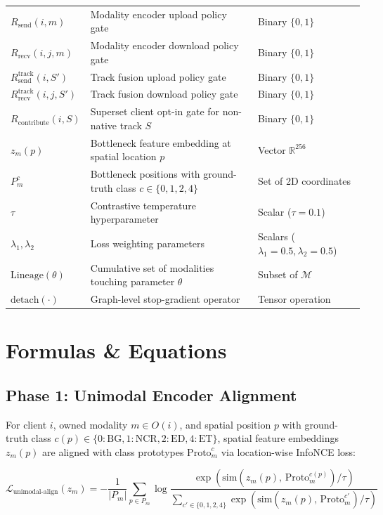 \documentclass[11pt,a4paper]{article}
\begin{document}
\begin{table}[h!]
\begin{tabular}{@{}llp{5.5cm}@{}}
$R_{\text{send}}(i,m)$ & Modality encoder upload policy gate & Binary $\{0,1\}$ \\
$R_{\text{recv}}(i,j,m)$ & Modality encoder download policy gate & Binary $\{0,1\}$ \\
$R_{\text{send}}^{\text{track}}(i,S')$ & Track fusion upload policy gate & Binary $\{0,1\}$ \\
$R_{\text{recv}}^{\text{track}}(i,j,S')$ & Track fusion download policy gate & Binary $\{0,1\}$ \\
$R_{\text{contribute}}(i,S)$ & Superset client opt-in gate for non-native track $S$ & Binary $\{0,1\}$ \\
$z_m(p)$ & Bottleneck feature embedding at spatial location $p$ & Vector $\mathbb{R}^{256}$ \\
$P_m^c$ & Bottleneck positions with ground-truth class $c \in \{0,1,2,4\}$ & Set of 2D coordinates \\
$\tau$ & Contrastive temperature hyperparameter & Scalar ($\tau = 0.1$) \\
$\lambda_1, \lambda_2$ & Loss weighting parameters & Scalars ($\lambda_1=0.5, \lambda_2=0.5$) \\
$\text{Lineage}(\theta)$ & Cumulative set of modalities touching parameter $\theta$ & Subset of $\mathcal{M}$ \\
$\text{detach}(\cdot)$ & Graph-level stop-gradient operator & Tensor operation \\ \bottomrule
\end{tabular}
\end{table}

\newpage

\section{Formulas \& Equations}

\subsection{Phase 1: Unimodal Encoder Alignment}

For client $i$, owned modality $m \in O(i)$, and spatial position $p$ with ground-truth class $c(p) \in \{0:\text{BG}, 1:\text{NCR}, 2:\text{ED}, 4:\text{ET}\}$, spatial feature embeddings $z_m(p)$ are aligned with class prototypes $\text{Proto}_m^c$ via location-wise InfoNCE loss:

\begin{equation}
\mathcal{L}_{\text{unimodal-align}}(z_m) = -\frac{1}{|P_m|} \sum_{p \in P_m} \log \frac{\exp\left(\text{sim}(z_m(p),\, \text{Proto}_m^{c(p)}) / \tau\right)}{\sum_{c' \in \{0,1,2,4\}} \exp\left(\text{sim}(z_m(p),\, \text{Proto}_m^{c'}) / \tau\right)}
\end{equation}
\end{document}
